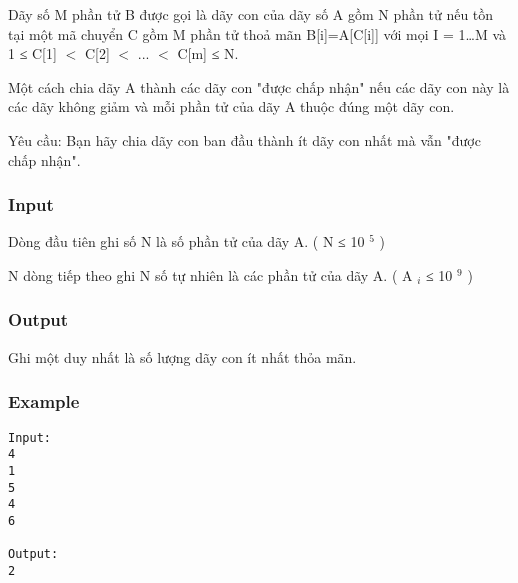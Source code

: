 



   Dãy số M phần tử B được gọi là dãy con của dãy số A gồm N phần tử nếu tồn tại một mã chuyển C gồm M phần tử thoả mãn B[i]=A[C[i]] với mọi I = 1…M và 1 ≤ C[1] $<$ C[2] $<$ ... $<$ C[m] ≤ N.  

   Một cách chia dãy A thành các dãy con "được chấp nhận" nếu các dãy con này là các dãy không giảm và mỗi phần tử của dãy A thuộc đúng một dãy con.  

   Yêu cầu: Bạn hãy chia dãy con ban đầu thành ít dãy con nhất mà vẫn "được chấp nhận".  

\subsubsection{   Input  }

   Dòng đầu tiên ghi số N là số phần tử của dãy A. ( N ≤ 10   $^    5   $   )  

   N dòng tiếp theo ghi N số tự nhiên là các phần tử của dãy A. (  A   $_    i   $   ≤ 10   $^    9   $   )  

\subsubsection{   Output  }

   Ghi một duy nhất là số lượng dãy con ít nhất thỏa mãn.  

\subsubsection{   Example  }
\begin{verbatim}
Input:
4
1
5
4
6

Output:
2

\end{verbatim}